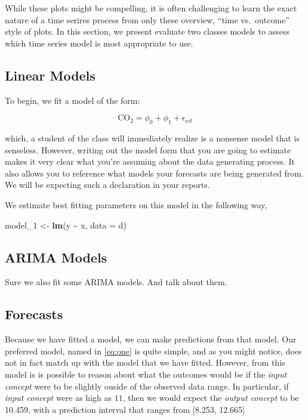 \documentclass[AER]{AEA}
\newenvironment{Shaded}{\begin{snugshade}}{\end{snugshade}}
\newcommand{\AttributeTok}[1]{\textcolor[rgb]{0.13,0.29,0.53}{#1}}
\newcommand{\FunctionTok}[1]{\textcolor[rgb]{0.13,0.29,0.53}{\textbf{#1}}}
\newcommand{\NormalTok}[1]{#1}
\newcommand{\OtherTok}[1]{\textcolor[rgb]{0.56,0.35,0.01}{#1}}
\newcommand{\SpecialCharTok}[1]{\textcolor[rgb]{0.81,0.36,0.00}{\textbf{#1}}}
\begin{document}
While these plots might be compelling, it is often challenging to learn
the exact nature of a time serires process from only these overview,
``time vs.~outcome'' style of plots. In this section, we present
evaluate two classes models to assess which time series model is most
appropriate to use.

\hypertarget{linear-models}{%
\subsection{Linear Models}\label{linear-models}}

To begin, we fit a model of the form:

\begin{equation}
\label{eq:one}
\text{CO}_{2} = \phi_{0} + \phi_{1} + \epsilon_{eit}
\end{equation}

which, a student of the class will immediately realize is a nonsense
model that is senseless. However, writing out the model form that you
are going to estimate makes it very clear what you're assuming about the
data generating process. It also allows you to reference what models
your forecasts are being generated from. We will be expecting such a
declaration in your reports.

We estimate best fitting parameters on this model in the following way,

\begin{Shaded}
\begin{Highlighting}[]
\NormalTok{model\_1 }\OtherTok{\textless{}{-}} \FunctionTok{lm}\NormalTok{(y }\SpecialCharTok{\textasciitilde{}}\NormalTok{ x, }\AttributeTok{data =}\NormalTok{ d)}
\end{Highlighting}
\end{Shaded}

\hypertarget{arima-models}{%
\subsection{ARIMA Models}\label{arima-models}}

Sure we also fit some ARIMA models. And talk about them.

\hypertarget{forecasts}{%
\subsection{Forecasts}\label{forecasts}}

Because we have fitted a model, we can make predictions from that model.
Our preferred model, named in \autoref{eq:one} is quite simple, and as
you might notice, does not in fact match up with the model that we have
fitted. However, from this model is is possible to reason about what the
outcomes would be if the \emph{input concept} were to be slightly ouside
of the observed data range. In particular, if \emph{input concept} were
as high as \(11\), then we would expect the \emph{output concept} to be
10.459, with a prediction interval that ranges from {[}8.253, 12.665{]}
\end{document}
